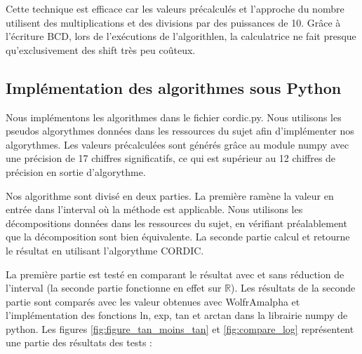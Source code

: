 \documentclass{article}
\def\cordicPythonFile{cordic.py}
\begin{document}
\vspace{1em}

Cette technique est efficace car les valeurs précalculés et l'approche du nombre utilisent des multiplications et des divisions par des puissances de 10. Grâce à l'écriture BCD, lors de l'exécutions de l'algorithlen, la calculatrice ne fait presque qu'exclusivement des shift très peu coûteux.

\subsection*{Implémentation des algorithmes sous Python}

Nous implémentons les algorithmes dans le fichier \cordicPythonFile. Nous utilisons les pseudos algorythmes données dans les ressources du sujet afin d'implémenter nos algorythmes. Les valeurs précalculées sont générés grâce au module numpy avec une précision de 17 chiffres significatifs, ce qui est supérieur au 12 chiffres de précision en sortie d'algorythme.

Nos algorithme sont divisé en deux parties. La première ramène la valeur en entrée dans l'interval où la méthode est applicable. Nous utilisons les décompositions données dans les ressources du sujet, en vérifiant préalablement que la décomposition sont bien équivalente. La seconde partie calcul et retourne le résultat en utilisant l'algorythme CORDIC.

La première partie est testé en comparant le résultat avec et sans réduction de l'interval (la seconde partie fonctionne en effet sur $\mathbb{R}$). Les résultats de la seconde partie sont comparés avec les valeur  obtenues avec WolfrAmalpha et l'implémentation des fonctions ln, exp, tan et arctan dans la librairie numpy de python. Les figures \ref{fig:figure_tan_moins_tan} et \ref{fig:compare_log} représentent une partie des résultats des tests :
\end{document}
